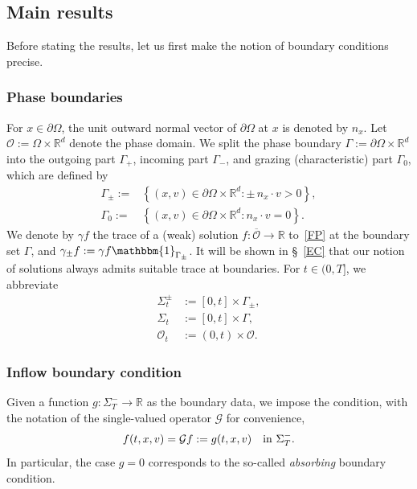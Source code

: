 \documentclass[10pt]{amsart}
\theoremstyle{definition}\newtheorem{defi}[theo]{Definition}\newtheorem{rema}[theo]{Remark}\newtheorem{exam}[theo]{Example}\newtheorem{exem}[theo]{Example}\newtheorem{nota}[theo]{Notation}
\newcommand*\p{\partial}
\newcommand*\R {\mathbb{R}}
\newcommand*\Gi {\mathcal{G}}
\newcommand*\OO {\mathcal{O}}
\begin{document}
\subsection{Main results}

Before stating the results, let us first make the notion of boundary conditions precise.

\subsubsection{Phase boundaries} 
For $x\in\p\Omega$, the unit outward normal vector of $\p\Omega$ at $x$ is denoted by $n_x$. Let $\OO:=\Omega\times\R^d$ denote the phase domain. We split the phase boundary $\Gamma:=\p\Omega\times\R^d$ into the outgoing part $\Gamma_+$, incoming part $\Gamma_-$, and grazing (characteristic) part $\Gamma_0$, which are defined by
\begin{align*}
\Gamma_\pm:=& \left\{(x,v)\in\p\Omega\times\R^d : \pm\, n_x\cdot v >0\right\},\\
\Gamma_0:=& \left\{(x,v)\in\p\Omega\times\R^d : n_x\cdot v =0\right\}.
\end{align*}
We denote by $\gamma f$ the trace of a (weak) solution $f:\overline{\OO}\rightarrow\R$ to~\eqref{FP} at the boundary set $\Gamma$, and $\gamma_\pm f:=\gamma f\mathbbm{1}_{\Gamma_\pm}$. It will be shown in \S~\ref{EC} that our notion of solutions always admits suitable trace at boundaries. For $t\in(0,T]$, we abbreviate
\begin{align*}
\Sigma_t^\pm&:=[0,t]\times\Gamma_\pm, \\
\Sigma_t&:=[0,t]\times\Gamma, \\
\OO_t&:=(0,t)\times\OO.
\end{align*}

\subsubsection{Inflow boundary condition} 
Given a function $g:\Sigma_T^-\rightarrow\R$ as the boundary data, we impose the condition, with the notation of the single-valued operator $\Gi$ for convenience,
\begin{align*}
f(t,x,v)=\Gi f:=g(t,x,v) {\quad\rm in\ }\Sigma_T^-.
\end{align*}
In particular, the case $g=0$ corresponds to the so-called \emph{absorbing} boundary condition.
\end{document}
